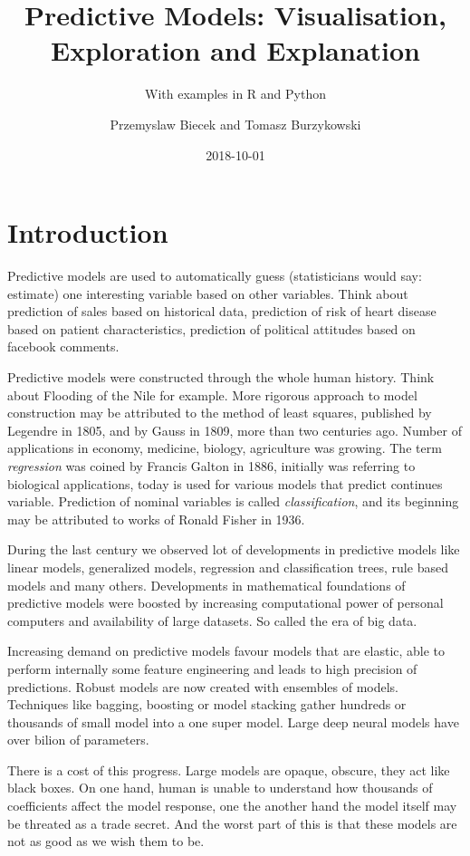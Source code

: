 \documentclass[]{krantz}
\title{Predictive Models: Visualisation, Exploration and Explanation}
\subtitle{With examples in R and Python}
\author{Przemyslaw Biecek and Tomasz Burzykowski}
\date{2018-10-01}
\theoremstyle{definition}
\theoremstyle{definition}
\theoremstyle{definition}
\theoremstyle{remark}
\begin{document}
\maketitle

{
\hypersetup{linkcolor=black}
\setcounter{tocdepth}{2}
\tableofcontents
}
\listoftables
\listoffigures
\hypertarget{introduction}{%
\section{Introduction}\label{introduction}}

Predictive models are used to automatically guess (statisticians would
say: estimate) one interesting variable based on other variables. Think
about prediction of sales based on historical data, prediction of risk
of heart disease based on patient characteristics, prediction of
political attitudes based on facebook comments.

Predictive models were constructed through the whole human history.
Think about Flooding of the Nile for example. More rigorous approach to
model construction may be attributed to the method of least squares,
published by Legendre in 1805, and by Gauss in 1809, more than two
centuries ago. Number of applications in economy, medicine, biology,
agriculture was growing. The term \emph{regression} was coined by
Francis Galton in 1886, initially was referring to biological
applications, today is used for various models that predict continues
variable. Prediction of nominal variables is called
\emph{classification}, and its beginning may be attributed to works of
Ronald Fisher in 1936.

During the last century we observed lot of developments in predictive
models like linear models, generalized models, regression and
classification trees, rule based models and many others. Developments in
mathematical foundations of predictive models were boosted by increasing
computational power of personal computers and availability of large
datasets. So called the era of big data.

Increasing demand on predictive models favour models that are elastic,
able to perform internally some feature engineering and leads to high
precision of predictions. Robust models are now created with ensembles
of models. Techniques like bagging, boosting or model stacking gather
hundreds or thousands of small model into a one super model. Large deep
neural models have over bilion of parameters.

There is a cost of this progress. Large models are opaque, obscure, they
act like black boxes. On one hand, human is unable to understand how
thousands of coefficients affect the model response, one the another
hand the model itself may be threated as a trade secret. And the worst
part of this is that these models are not as good as we wish them to be.
\end{document}
